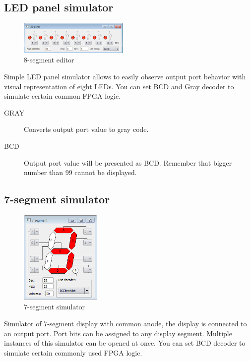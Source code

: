     \subsection{LED panel simulator}
        \begin{figure}
            \centering
            \includegraphics[width=150pt]{img/Led_panel.png}
            \caption{8-segment editor}
        \end{figure}

        Simple LED panel simulator allows to easily observe output port behavior with visual representation of eight LEDs. You can set BCD and Gray decoder to simulate certain common FPGA logic.

        \begin{description}
            \item[GRAY] Converts output port value to gray code.
            \item[BCD] Output port value will be presented as BCD. Remember that bigger number than 99 cannot be displayed.
        \end{description}

    \subsection{7-segment simulator}
        \begin{figure}
            \centering
            \includegraphics[width=110pt]{img/7seg_sim.png}
            \caption{7-segment simulator}
        \end{figure}
        Simulator of 7-segment display with common anode, the display is connected to an output port. Port bits can be
        assigned to any display segment. Multiple instances of this simulator can be opened at once. You can set BCD decoder to simulate certain commonly used FPGA logic.


